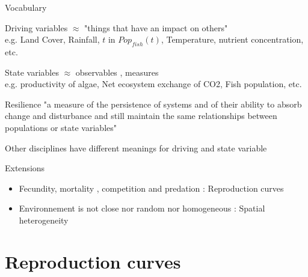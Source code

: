 \documentclass[11,aspectratio=1610]{beamer}
\begin{document}
\begin{frame}{Vocabulary}


\begin{small}
\begin{block}{\alert{Driving variables}} $\approx$ "things that have an impact on others" \\
e.g. Land Cover, Rainfall, $t$ in $Pop_{fish}(t)$, Temperature, nutrient concentration, etc.
\end{block}
\vfill

\begin{block}{\alert{State variables}} $\approx$   observables , measures\\
 e.g. productivity of algae, Net ecosystem exchange of CO2, Fish population, etc.  
\end{block}
\vfill

\begin{block}{\alert{Resilience}}  "a measure of the \alert{persistence} of systems and of their \alert{ability to absorb change} and disturbance and still \alert{maintain
the same relationships} between populations or state variables"
\end{block}

\vfill
\end{small}

\tiny{Other disciplines have different meanings for driving and state variable}


\end{frame}





\begin{frame}{Extensions}



\begin{small}
\begin{itemize}
  \item Fecundity, mortality , competition and predation : \alert{Reproduction curves}
  \item  Environnement is not close nor random nor homogeneous : \alert{Spatial heterogeneity} 
  \end{itemize}


\end{small}
  
\end{frame}




\section{Reproduction curves}
\end{document}
